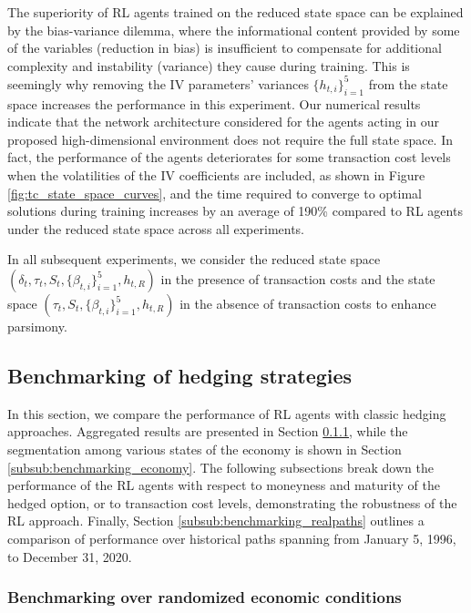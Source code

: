 \documentclass[12pt]{article}
\begin{document}
The superiority of RL agents trained on the reduced state space can be explained by the bias-variance dilemma, where the informational content provided by some of the variables (reduction in bias) is insufficient to compensate for additional complexity and instability (variance) they cause during training. 
This is seemingly why removing the IV parameters' variances $\{ h_{t,i}\}^5_{i=1}$ from the state space increases the performance in this experiment. Our numerical results indicate that the network architecture considered for the agents acting in our proposed high-dimensional environment does not require the full state space. In fact, the performance of the agents deteriorates for some transaction cost levels when the volatilities of the IV coefficients are included, as shown in Figure \ref{fig:tc_state_space_curves}, and the time required to converge to optimal solutions during training increases by an average of 190\% compared to RL agents under the reduced state space across all experiments. 

In all subsequent experiments, we consider the reduced state space $(\delta_{t},\tau_{t},S_{t},\{\beta_{t,i} \}^5_{i=1}, h_{t,R})$ in the presence of transaction costs and the state space $(\tau_{t},S_{t},\{\beta_{t,i} \}^5_{i=1}, h_{t,R})$ in the absence of transaction costs to enhance parsimony. 

\subsection{Benchmarking of hedging strategies}

In this section, we compare the performance of RL agents with classic hedging approaches. Aggregated results are presented in Section \ref{subsub:benchmarking_general}, while the segmentation among various states of the economy is shown in Section \ref{subsub:benchmarking_economy}. The following subsections break down the performance of the RL agents with respect to moneyness and maturity of the hedged option, or to transaction cost levels, demonstrating the robustness of the RL approach. Finally, Section \ref{subsub:benchmarking_realpaths} outlines a comparison of performance over historical paths spanning from January 5, 1996, to December 31, 2020.

\subsubsection{Benchmarking over randomized economic conditions}\label{subsub:benchmarking_general}
\end{document}
